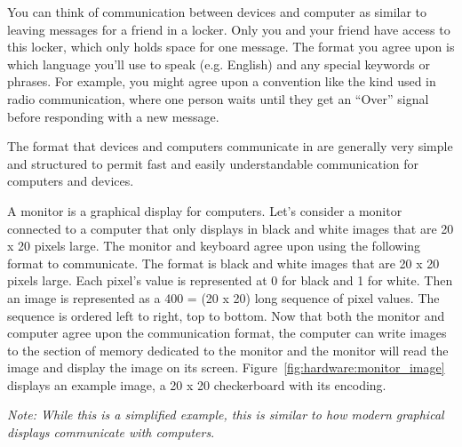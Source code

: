 \begin{example}
  You can think of communication between devices and computer as similar to
  leaving messages for a friend in a locker. Only you and your friend have
  access to this locker, which only holds space for one message. The format you
  agree upon is which language you'll use to speak (e.g. English) and any
  special keywords or phrases. For example, you might agree upon a convention
  like the kind used in radio communication, where one person waits until they
  get an ``Over'' signal before responding with a new message.
\end {example}

The format that devices and computers communicate in are generally very simple
and structured to permit fast and easily understandable communication for
computers and devices.

\begin{example}
A monitor is a graphical display for computers. Let's consider a monitor
connected to a computer that only displays in black and white images
that are 20 x 20 pixels large. The monitor and keyboard agree upon using
the following format to communicate. The format is black and white images
that are 20 x 20 pixels large. Each pixel's value is represented at 0 for
black and 1 for white. Then an image is represented as a 400 = (20 x 20) long
sequence of pixel values. The sequence is ordered left to right, top to bottom.
Now that both the monitor and computer agree upon the communication format, the
computer can write images to the section of memory dedicated to the monitor
and the monitor will read the image and display the image on its screen.
Figure~\ref{fig:hardware:monitor_image} displays an example image, a 
20 x 20 checkerboard with its encoding.

\emph{Note: While this is a simplified example, this is similar to how modern
  graphical displays communicate with computers}.
\end{example}

